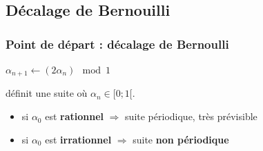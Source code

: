 \documentclass{beamer}
\begin{document}
\subsection{Décalage de Bernouilli}
\begin{frame}
  \frametitle{Point de départ : décalage de Bernoulli}
  \begin{center}
    {\LARGE $\alpha_{n+1} \leftarrow (2\alpha_n)\mod1$\par}
    \medskip
    définit une suite où $\alpha_n \in [0;1[$.
  \end{center}
  \medskip
  \begin{itemize}
  \item<3-> si $\alpha_0$ est \textbf{rationnel} $\Rightarrow$ suite périodique, très prévisible \\
  \item<4-> si $\alpha_0$ est \textbf{irrationnel} $\Rightarrow$ suite \textbf{non périodique}
  \end{itemize}
\end{frame}
\end{document}
